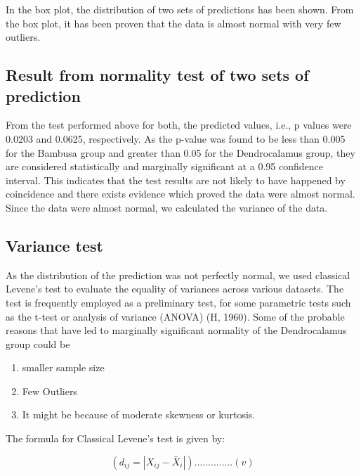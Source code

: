 \documentclass[preprint, 3p,
authoryear]{elsarticle} %
\begin{document}
In the box plot, the distribution of two sets of predictions has been
shown. From the box plot, it has been proven that the data is almost
normal with very few outliers.

\hypertarget{result-from-normality-test-of-two-sets-of-prediction}{%
\subsection{Result from normality test of two sets of
prediction}\label{result-from-normality-test-of-two-sets-of-prediction}}

From the test performed above for both, the predicted values, i.e., p
values were 0.0203 and 0.0625, respectively. As the p-value was found to
be less than 0.005 for the Bambusa group and greater than 0.05 for the
Dendrocalamus group, they are considered statistically and marginally
significant at a 0.95 confidence interval. This indicates that the test
results are not likely to have happened by coincidence and there exists
evidence which proved the data were almost normal. Since the data were
almost normal, we calculated the variance of the data.

\hypertarget{variance-test}{%
\subsection{Variance test}\label{variance-test}}

As the distribution of the prediction was not perfectly normal, we used
classical Levene's test to evaluate the equality of variances across
various datasets. The test is frequently employed as a preliminary test,
for some parametric tests such as the t-test or analysis of variance
(ANOVA) (H, 1960). Some of the probable reasons that have led to
marginally significant normality of the Dendrocalamus group could be

\begin{enumerate}
\def\labelenumi{\alph{enumi}.}
\item
  smaller sample size
\item
  Few Outliers
\item
  It might be because of moderate skewness or kurtosis.
\end{enumerate}

The formula for Classical Levene's test is given by:

\[( d_{ij} = |X_{ij} - \bar{X}_i| ) ..............(v)\]
\end{document}
